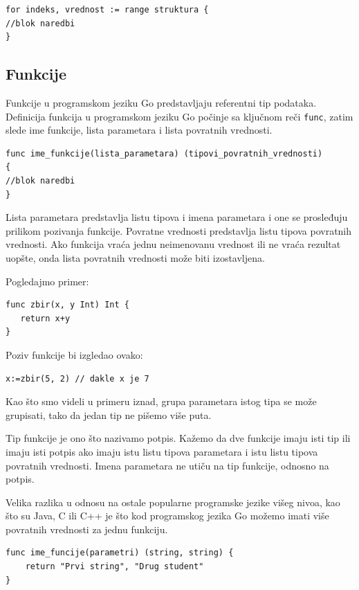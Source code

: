 \documentclass[a4paper]{article}
\begin{document}
\begin{lstlisting}[caption={Primer \texttt{for-range} petlje},frame=single, label=Primer_for-range_petlje]
for indeks, vrednost := range struktura {
//blok naredbi
}
\end{lstlisting}

\subsection{Funkcije}
\label{subsec:funkcije}

Funkcije u programskom jeziku Go predstavljaju referentni tip podataka. Definicija funkcija u programskom jeziku Go počinje sa ključnom reči \texttt{func}, zatim slede ime funkcije, lista parametara i lista povratnih vrednosti. 

\begin{lstlisting}[caption={Deklaracija fukcije},frame=single, label=Deklaracija_funkcije]
func ime_funkcije(lista_parametara) (tipovi_povratnih_vrednosti)
{
//blok naredbi
}
\end{lstlisting}

Lista parametara predstavlja listu tipova i imena parametara i one se prosleđuju prilikom pozivanja funkcije.
Povratne vrednosti predstavlja listu tipova povratnih vrednosti. Ako funkcija vraća jednu neimenovanu vrednost ili ne vraća rezultat uopšte, onda lista povratnih vrednosti može biti izostavljena.

Pogledajmo primer:

\begin{lstlisting}[caption={Primer funkcije},frame=single, label=Primer_funkcije]
func zbir(x, y Int) Int {
   return x+y
}
\end{lstlisting}

Poziv funkcije bi izgledao ovako:

\begin{lstlisting}[caption={Primer poziva funkcije},frame=single, label=Primer_poziva_funkcije]
x:=zbir(5, 2) // dakle x je 7
\end{lstlisting}

Kao što smo videli u primeru iznad, grupa parametara istog tipa se može grupisati, tako da jedan tip ne pišemo više puta.

Tip funkcije je ono što nazivamo potpis. Kažemo da dve funkcije imaju isti tip ili imaju isti potpis ako imaju istu listu tipova parametara i istu listu tipova povratnih vrednosti. Imena parametara ne utiču na tip funkcije, odnosno na potpis.

Velika razlika u odnosu na ostale popularne programske jezike višeg nivoa, kao što su Java, C ili C++ je što kod programskog jezika Go možemo imati više povratnih vrednosti za jednu funkciju. 
\begin{lstlisting}[caption={Primer funkcije sa više povratnih vrednosti},frame=single, label=Primer_funkcije_sa_vise_povratnih_vrednosti]
func ime_funcije(parametri) (string, string) {
	return "Prvi string", "Drug student"
}
\end{lstlisting}
\end{document}
